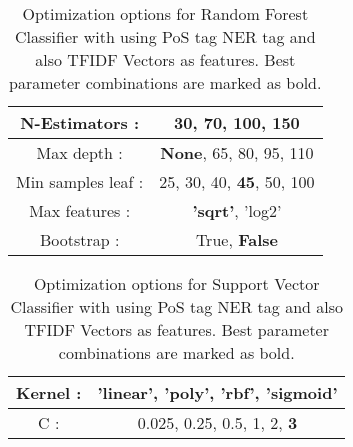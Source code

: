 \documentclass{article}
\begin{document}
\begin{thebibliography}{9}
\begin{table}
\centering
\begin{tabular}{|c|c|}
\hline
N-Estimators : & \textbf{30}, 70, 100, 150 \\
\hline
Max depth : & \textbf{None}, 65, 80, 95, 110 \\
\hline
Min samples leaf : & 25, 30, 40, \textbf{45}, 50, 100 \\
\hline
Max features : & \textbf{'sqrt'}, 'log2' \\
\hline
Bootstrap : & True, \textbf{False} \\
\hline
\end{tabular}
\caption{Optimization options for Random Forest Classifier with using PoS tag NER tag and also TFIDF Vectors as features. Best parameter combinations are marked as bold.}
\label{RandomForest-opt-TFIDF}
\end{table}

\begin{table}
\centering
\begin{tabular}{|c|c|}
\hline
Kernel : & \textbf{'linear'}, 'poly', 'rbf', 'sigmoid' \\
\hline
C : & 0.025, 0.25, 0.5, 1, 2, \textbf{3} \\
\hline
\end{tabular}
\caption{Optimization options for Support Vector Classifier with using PoS tag NER tag and also TFIDF Vectors as features. Best parameter combinations are marked as bold.}
\label{SVC-opt-TFIDF}
\end{table}

\end{thebibliography}
\end{document}
